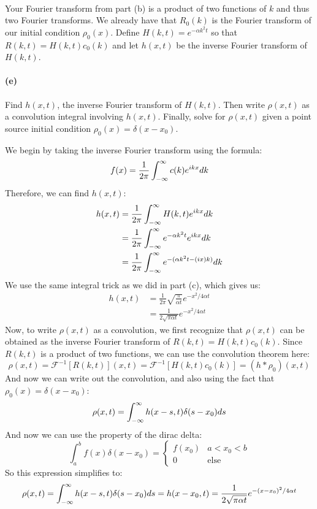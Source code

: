 \documentclass{article}
\begin{document}
\phline
\paragraph{}
Your Fourier transform from part (b) is a product of two functions of $k$ and thus two Fourier transforms.  
We already have that $R_{0}(k)$ is the Fourier transform of our initial condition $\rho_{0}(x)$.
Define $H(k,t) = e^{-\alpha k^{2}t}$ so that $R(k,t) = H(k,t)c_{0}(k)$ and let $h(x,t)$ be the inverse Fourier transform of $H(k,t)$.  

\paragraph{(e)}
Find $h(x,t)$, the inverse Fourier transform of $H(k,t)$.  Then write $\rho(x,t)$ as a convolution integral involving $h(x,t)$.  Finally, solve for 
$\rho(x,t)$ given a point source initial condition $\rho_{0}(x) = \delta(x-x_{0})$.\\

\begin{solution}
	We begin by taking the inverse Fourier transform using the formula:
	\[
		f(x) = \frac{1}{2\pi}\int_{-\infty}^{\infty} c(k) e^{ikx} dk 
	\] 
	Therefore, we can find $h(x, t)$:
	\begin{align*}
		h(x, t) &= \frac{1}{2\pi}\int_{-\infty}^{\infty} H(k, t) e^{ikx} dk \\
				&= \frac{1}{2\pi}\int_{-\infty}^{\infty} e^{-\alpha k^2 t} e^{ikx} dk \\
				&= \frac{1}{2\pi}\int_{-\infty}^{\infty} e^{-(\alpha k^2 t - (ix)k)} dk 
	\end{align*}
	We use the same integral trick as we did in part (c), which gives us:
	\begin{align*}
		h(x, t) &= \frac{1}{2\pi}\sqrt{\frac{\pi}{\alpha t}} e^{-x^2 / 4 \alpha t}\\
				&= \frac{1}{2\sqrt{\pi \alpha t} }e^{-x^2 / 4\alpha t}
	\end{align*}
	Now, to write $\rho(x, t)$ as a convolution, we first recognize that $\rho(x, t)$ can be obtained 
	as the inverse Fourier transform of $R(k, t) = H(k, t) c_0(k)$. Since $R(k, t)$ is a product of two 
	functions, we can use the convolution theorem here:
	\[
		\rho(x, t) = \mathcal F^{-1}[R(k, t)](x, t) = \mathcal F^{-1}[H(k, t)c_0(k)] = (h \ast \rho_0)
		(x, t)
	\] 
	And now we can write out the convolution, and also using the fact that $\rho_0(x) = \delta(x - x_0)$:
	\[
		\rho(x, t) = \int_{-\infty}^{\infty} h(x - s, t) \delta(s - x_0) ds
	\]
	And now we can use the property of the dirac delta:
	\[
	\int_a^b f(x) \delta(x - x_0) = \begin{cases}
		f(x_0) & a < x_0 < b\\ 
		0 &\text{else}
	\end{cases}
	\] 
	So this expression simplifies to:
	\[
	\rho(x, t) = \int_{-\infty}^{\infty} h(x - s, t) \delta(s - x_0) ds = h(x - x_0, t) = \frac{1}{2\sqrt{\pi \alpha t} }
	e^{-(x - x_0)^2 / 4\alpha t}
	\] 
\end{solution}
\end{document}
